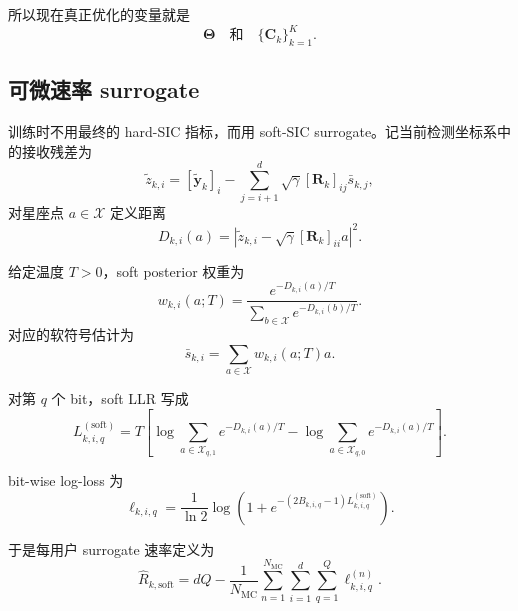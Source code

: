 \documentclass[11pt]{ctexart}
\newcommand{\Xset}{\mathcal{X}}
\begin{document}
所以现在真正优化的变量就是
\begin{equation}
    \bm{\Theta}
    \quad\text{和}\quad
    \{\bm{C}_k\}_{k=1}^{K}.
\end{equation}

\subsection{可微速率 surrogate}
训练时不用最终的 hard-SIC 指标，而用 soft-SIC surrogate。记当前检测坐标系中的接收残差为
\begin{equation}
    \widetilde{z}_{k,i}
    =
    [\widetilde{\bm{y}}_k]_i
    -
    \sum_{j=i+1}^{d}
    \sqrt{\gamma}[\bm{R}_k]_{ij}\bar{s}_{k,j},
\end{equation}
对星座点 $a\in\Xset$ 定义距离
\begin{equation}
    D_{k,i}(a)
    =
    \left|
        \widetilde{z}_{k,i}
        -
        \sqrt{\gamma}[\bm{R}_k]_{ii}a
    \right|^2.
\end{equation}

给定温度 $T>0$，soft posterior 权重为
\begin{equation}
    w_{k,i}(a;T)
    =
    \frac{
        e^{-D_{k,i}(a)/T}
    }{
        \sum_{b\in\Xset} e^{-D_{k,i}(b)/T}
    }.
\end{equation}
对应的软符号估计为
\begin{equation}
    \bar{s}_{k,i}
    =
    \sum_{a\in\Xset}w_{k,i}(a;T)a.
\end{equation}

对第 $q$ 个 bit，soft LLR 写成
\begin{equation}
    L_{k,i,q}^{(\mathrm{soft})}
    =
    T\left[
        \log\sum_{a\in\Xset_{q,1}} e^{-D_{k,i}(a)/T}
        -
        \log\sum_{a\in\Xset_{q,0}} e^{-D_{k,i}(a)/T}
    \right].
\end{equation}

bit-wise log-loss 为
\begin{equation}
    \ell_{k,i,q}
    =
    \frac{1}{\ln 2}
    \log\!\left(
        1+e^{-(2B_{k,i,q}-1)L_{k,i,q}^{(\mathrm{soft})}}
    \right).
\end{equation}

于是每用户 surrogate 速率定义为
\begin{equation}
    \widehat{R}_{k,\mathrm{soft}}
    =
    dQ
    -
    \frac{1}{N_{\mathrm{MC}}}
    \sum_{n=1}^{N_{\mathrm{MC}}}
    \sum_{i=1}^{d}
    \sum_{q=1}^{Q}
    \ell_{k,i,q}^{(n)}.
\end{equation}
\end{document}
